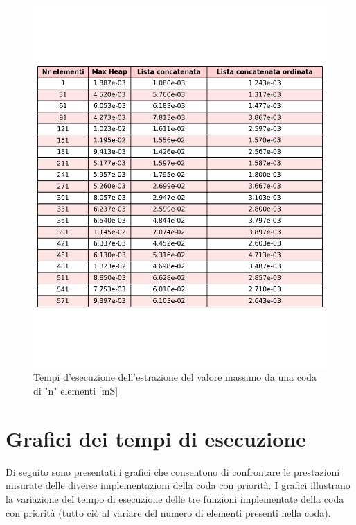 \documentclass{article}
\begin{document}
\begin{figure}[h]
    \centering
    \includegraphics[width=\textwidth]{Images/TempoEstMassimo.png}
    \caption{Tempi d'esecuzione dell'estrazione del valore massimo da una coda di "n" elementi [mS]}
    \label{fig:TabellaEstrazione}
\end{figure}

\clearpage

\section{Grafici dei tempi di esecuzione}

\label{sec:grafici}

Di seguito sono presentati i grafici che consentono di confrontare le prestazioni misurate delle diverse implementazioni della coda con priorità.
I grafici illustrano la variazione del tempo di esecuzione delle tre funzioni implementate della coda con priorità (tutto ciò al variare del numero di elementi presenti nella coda).
\end{document}
